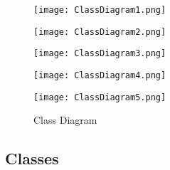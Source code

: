 \documentclass[12pt]{article}
\begin{document}
\begin{figure}[H]
\texttt{[image: ClassDiagram1.png]}
\end{figure}

\begin{figure}[H]
\texttt{[image: ClassDiagram2.png]}
\end{figure}

\begin{figure}[H]
\texttt{[image: ClassDiagram3.png]}
\end{figure}

\begin{figure}[H]
\texttt{[image: ClassDiagram4.png]}
\end{figure}

\begin{figure}[H]
\texttt{[image: ClassDiagram5.png]}
\caption{Class Diagram}
\label{fig:class-diagram}
\end{figure}

\clearpage

\subsection{Classes}
\end{document}

